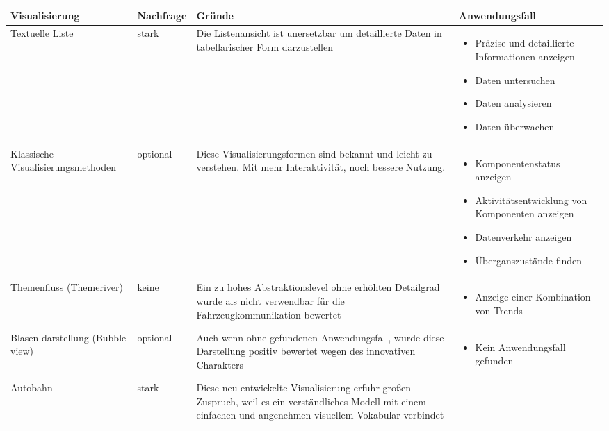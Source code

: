\documentclass[draft=false
              ,paper=a4
              ,twoside=false
              ,fontsize=11pt
              ,headsepline
              ,BCOR10mm
              ,DIV11
              ]{scrbook}
\begin{document}
\begin{table}[htbp]
  \begin{tabularx}{\textwidth}{X|l|X|p{5cm}}%
    \textbf{Visualisierung} & \textbf{Nachfrage} & \textbf{Gründe} & \textbf{Anwendungsfall} \\ \hline
    Textuelle Liste & stark & Die Listenansicht ist unersetzbar um detaillierte Daten in tabellarischer Form darzustellen & 
    \begin{itemize}[noitemsep,nolistsep]
      \item Präzise und detaillierte Informationen anzeigen
      \item Daten untersuchen
      \item Daten analysieren
      \item Daten überwachen
    \end{itemize} \\ \hline
    Klassische Visualisierungsmethoden & optional & Diese Visualisierungsformen sind bekannt und leicht zu verstehen. Mit mehr Interaktivität, noch bessere Nutzung. &
    \begin{itemize}[noitemsep,nolistsep]
      \item Komponentenstatus anzeigen
      \item Aktivitätsentwicklung von Komponenten anzeigen
      \item Datenverkehr anzeigen
      \item Überganszustände finden
    \end{itemize} \\ \hline
    Themenfluss (Themeriver) & keine & Ein zu hohes Abstraktionslevel ohne erhöhten Detailgrad wurde als nicht verwendbar für die Fahrzeugkommunikation bewertet &
    \begin{itemize}[noitemsep,nolistsep]
      \item Anzeige einer Kombination von Trends
    \end{itemize} \\ \hline
    Blasen-\newline darstellung (Bubble view) & optional & Auch wenn ohne gefundenen Anwendungsfall, wurde diese Darstellung positiv bewertet wegen des innovativen Charakters &
    \begin{itemize}[noitemsep,nolistsep]
      \item Kein Anwendungsfall gefunden
    \end{itemize} \\ \hline
    Autobahn & stark & Diese neu entwickelte Visualisierung erfuhr großen Zuspruch, weil es ein verständliches Modell mit einem einfachen und angenehmen visuellem Vokabular verbindet  &

\end{tabularx}
\end{table}
\end{document}
